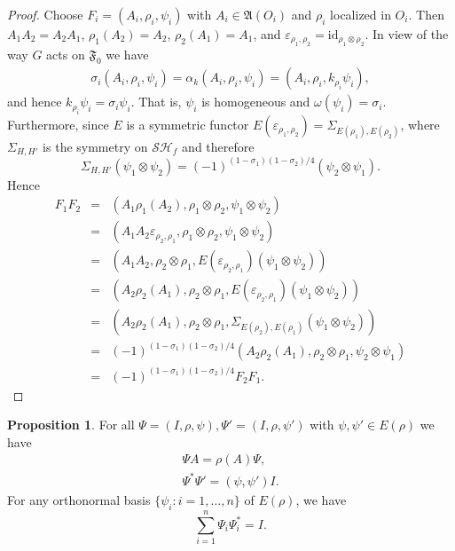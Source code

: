 \documentclass[11pt]{article}
\newcommand{\alg}[1]{\mathfrak{#1}}
\theoremstyle{definition}
\newtheorem{prop}[thm]{Proposition}
\theoremstyle{definition}
\theoremstyle{remark}
\newcommand{\ve}{\varepsilon}
\def\2#1{{\mathcal #1}}
\def\a{\alpha} \def\b{\beta} \def\g{\gamma} \def\d{\delta}
\def\om{\omega} \def\Om{\Omega} \def\dd{\partial} \def\D{\Delta}
\def\id{\mathrm{id}}
\begin{document}
\begin{proof} Choose $F_i=(A_i,\rho _i,\psi _i)$ with $A_i\in \alg{A}(O_i)$ and $\rho
  _i$ localized in $O_i$.  Then $A_1A_2=A_2A_1$, $\rho _1(A_2)=A_2$, $\rho
  _2(A_1)=A_1$, and $\ve _{\rho _1,\rho _2}=\id _{\rho _1\otimes \rho _2}$.  In view
  of the way $G$ acts on $\alg{F}_0$ we have 
  \begin{eqnarray*} \sigma _i(A_i,\rho _i,\psi _i) =\a _k(A_i,\rho _i,\psi _i) =
    (A_i,\rho _i,k_{\rho _i}\psi _i ) ,\end{eqnarray*} and hence $k_{\rho _i}\psi
  _i=\sigma _i\psi _i$.  That is, $\psi _i$ is homogeneous and $\om (\psi _i)=\sigma
  _i$.  Furthermore, since $E$ is a symmetric functor $E(\ve _{\rho _1,\rho
    _2})=\Sigma _{E(\rho _1),E(\rho _2)}$, where $\Sigma _{H,H'}$ is the symmetry on
  $\2S\2H_f$ and therefore
$$  \Sigma _{H,H'}(\psi _1\otimes \psi _2)=(-1)^{(1-\sigma _1)(1-\sigma _2)/4}(\psi
_2\otimes \psi _1) .$$ Hence
\begin{eqnarray*} F_1F_2 &=& (A_1\rho _1(A_2),\rho _1\otimes \rho _2,\psi _1\otimes  \psi _2)  \\ 
  &=& (A_1A_2 \ve _{\rho _2,\rho _1}, \rho _1\otimes \rho _2 ,\psi _1\otimes \psi_2) \\
  &=& (A_1A_2,\rho _2\otimes \rho _1,E(\ve _{\rho _2,\rho _1})(\psi _1\otimes \psi_2)) \\
  &=& (A_2\rho _2(A_1),\rho _2\otimes \rho _1, E(\ve _{\rho _2,\rho _1})(\psi_1\otimes \psi _2)) \\
  &=& (A_2\rho _2(A_1) ,\rho _2\otimes \rho _1,\Sigma _{E(\rho _2),E(\rho _1)}(\psi _1\otimes \psi _2)) \\
  &=& (-1)^{(1-\sigma _1)(1-\sigma _2)/4}(A_2\rho _2(A_1),\rho _2\otimes \rho _1,\psi_2\otimes \psi _1 ) \\
  &=& (-1)^{(1-\sigma _1)(1-\sigma _2)/4} F_2F_1 . \end{eqnarray*}
\end{proof}



\begin{prop} For all $\Psi =(I,\rho ,\psi),\Psi '=(I,\rho ,\psi ')$ with $\psi ,\psi
  '\in E(\rho)$ we have
  \begin{eqnarray}
    \Psi A = \rho (A)\Psi ,   \label{induce} \\
    \Psi ^*\Psi ' = (\psi ,\psi ')I .  
    \label{cuntz}  \end{eqnarray}
  For any orthonormal basis $\{ \psi _i:i=1,\dots, n\}$ of $E(\rho )$, we have 
  \begin{equation} \sum _{i=1}^{n}\Psi _i\Psi _i^* = I .
  \label{basisz} \end{equation}
  \label{ip} \end{prop}
\end{document}
